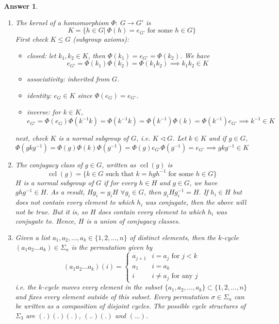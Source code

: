 \documentclass[a4paper]{article}
\DeclareMathOperator{\ccl}{ccl}
\newtheorem{ans}{Answer}[section]
\theoremstyle{new}
\begin{document}
\begin{ans}\leavevmode
\begin{enumerate}[label=(\alph*)]
\item The kernel of a homomorphism $\Phi:~G\rightarrow G'$ is
$$K=\{h\in G|~\Phi(h)=e_{G'}\text{ for some }h\in G\}$$
First check $K\leq G$ (subgroup axioms):
\begin{itemize}
    \item closed: let $k_1,k_2\in K$, then $\Phi(k_1)=e_{G'}=\Phi(k_2)$. We have
    $$e_{G'}=\Phi(k_1)\Phi(k_2)=\Phi(k_1k_2)\implies k_1k_2\in K$$
    \item associativity: inherited from $G$.
    \item identity: $e_G\in K$ since $\Phi(e_G)=e_{G'}$.
    \item inverse: for $k\in K$,
    $$e_{G'}=\Phi(e_G)\Phi(k^{-1}k)=\Phi(k^{-1}k)=\Phi(k^{-1})\Phi(k)=\Phi(k^{-1})e_{G'}\implies k^{-1}\in K$$
\end{itemize}
next, check $K$ is a normal subgroup of $G$, i.e. $K\lhd G$. Let $k\in K$ and if $g\in G$,
$$\Phi(gkg^{-1})=\Phi(g)\Phi(k)\Phi(g^{-1})=\Phi(g)e_{G'}\Phi(g^{-1})=e_{G'}\implies gkg^{-1}\in K$$
\item The conjugacy class of $g\in G$, written as $\ccl(g)$ is
$$\ccl(g)=\{k\in G\text{ such that }k=hgh^{-1}\text{ for some }h\in G\}$$
$H$ is a normal subgroup of $G$ if for every $h\in H$ and $g\in G$, we have $ghg^{-1}\in H$. As a result, $Hg_i=g_iH$ $\forall g_i\in G$, then $g_iHg_i^{-1}=H$. If $h_i\in H$ but does not contain every element to which $h_i$ was conjugate, then the above will not be true. But it is, so $H$ does contain every element to which $h_i$ was conjugate to. Hence, $H$ is a union of conjugacy classes.
\newpage
\item Given a list $a_1,a_2,\dots,a_k\in\{1,2,\dots,n\}$ of distinct elements, then the $k$-cycle $(a_1a_2\dots a_k)\in \Sigma_n$ is the permutation given by
$$(a_1a_2\dots a_k)(i)=
\left\{
        \begin{array}{ll}
      a_{j+1} & i=a_j\text{ for }j<k \\
      a_1 & i=a_k\\
      i & i\neq a_j\text{ for any }j
        \end{array}
    \right.$$
i.e. the $k$-cycle moves every element in the subset $\{a_1,a_2,\dots,a_k\}\subset\{1,2,\dots,n\}$ and fixes every element outside of this subset. Every permutation $\sigma\in\Sigma_n$ can be written as a composition of disjoint cycles. The possible cycle structures of $\Sigma_3$ are $(.)(.)(.)$, $(..)(.)$ and $(...)$.

\end{enumerate}
\end{ans}
\end{document}
